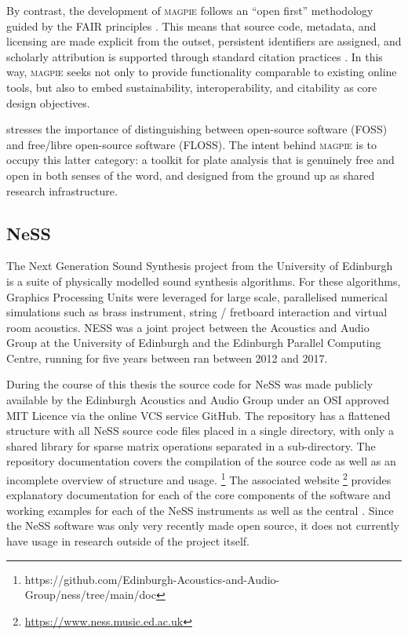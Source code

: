 By contrast, the development of \textsc{magpie} follows an ``open first'' methodology guided by the FAIR principles \cite{wilkinson_fair_2016,go_fair_2016}. This means that source code, metadata, and licensing are made explicit from the outset, persistent identifiers are assigned, and scholarly attribution is supported through standard citation practices \cite{soito_citations_2016}. In this way, \textsc{magpie} seeks not only to provide functionality comparable to existing online tools, but also to embed sustainability, interoperability, and citability as core design objectives.

\textcite{stallman_floss_2021} stresses the importance of distinguishing between open-source software (FOSS) and free/libre open-source software (FLOSS). The intent behind \textsc{magpie} is to occupy this latter category: a toolkit for plate analysis that is genuinely free and open in both senses of the word, and designed from the ground up as shared research infrastructure.


\subsection{NeSS}
The Next Generation Sound Synthesis project from the University of Edinburgh is a suite of physically modelled sound synthesis algorithms. For these algorithms, Graphics Processing Units were leveraged for large scale, parallelised numerical simulations such as brass instrument, string / fretboard interaction and virtual room acoustics. NESS was a joint project between the Acoustics and Audio Group at the University of Edinburgh and the Edinburgh Parallel Computing Centre, running for five years between ran between 2012 and 2017. 

During the course of this thesis the source code for NeSS was made publicly available by the Edinburgh Acoustics and Audio Group under an OSI approved MIT Licence via the online VCS service GitHub. The repository has a flattened structure with all NeSS source code files placed in a single directory, with only a shared library for sparse matrix operations separated in a sub-directory. 
The repository documentation covers the compilation of the source code as well as an incomplete overview of structure and usage.
\footnote{https://github.com/Edinburgh-Acoustics-and-Audio-Group/ness/tree/main/doc}
The associated website 
\footnote{\url{https://www.ness.music.ed.ac.uk}}
provides explanatory documentation for each of the core components of the software and working examples for each of the NeSS instruments as well as the central  \cite{ness_welcome_2016}. 
Since the NeSS software was only very recently made open source, it does not currently have usage in research outside of the project itself. 

